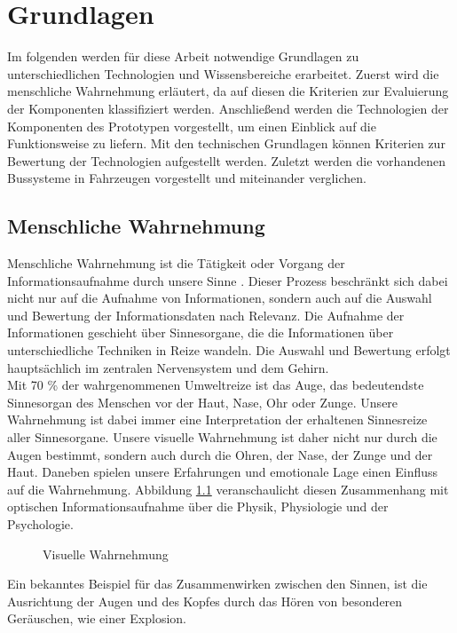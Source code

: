 \chapter{Grundlagen}
\label{cha:Grundlagen}
Im folgenden werden für diese Arbeit notwendige Grundlagen zu unterschiedlichen Technologien und Wissensbereiche erarbeitet. 
Zuerst wird die menschliche Wahrnehmung erläutert, da auf diesen die Kriterien zur Evaluierung der Komponenten klassifiziert werden. Anschließend werden die Technologien der Komponenten des Prototypen vorgestellt, um einen Einblick auf die Funktionsweise zu liefern. Mit den technischen Grundlagen können Kriterien zur Bewertung der Technologien aufgestellt werden. Zuletzt werden die vorhandenen Bussysteme in Fahrzeugen vorgestellt und miteinander verglichen.
\section{Menschliche Wahrnehmung}
Menschliche Wahrnehmung ist die \glqq Tätigkeit oder Vorgang der Informationsaufnahme durch unsere Sinne\grqq{} \cite[Seite 12]{Buhler.2017}. Dieser Prozess beschränkt sich dabei nicht nur auf die Aufnahme von Informationen, sondern auch auf die Auswahl und Bewertung der Informationsdaten nach Relevanz. Die Aufnahme der Informationen geschieht über Sinnesorgane, die die Informationen über unterschiedliche Techniken in Reize wandeln. Die Auswahl und Bewertung erfolgt hauptsächlich im zentralen Nervensystem und dem Gehirn. \cite[Vgl. Seite 12]{Buhler.2017}\\
Mit 70 \% der wahrgenommenen Umweltreize ist das Auge, das bedeutendste Sinnesorgan des Menschen vor der Haut, Nase, Ohr oder Zunge. Unsere Wahrnehmung ist dabei immer eine Interpretation der erhaltenen Sinnesreize aller Sinnesorgane. Unsere visuelle Wahrnehmung ist daher nicht nur durch die Augen bestimmt, sondern auch durch die Ohren, der Nase, der Zunge und der Haut. Daneben spielen unsere Erfahrungen und emotionale Lage einen Einfluss auf die Wahrnehmung. \cite[Vgl. Seite 13 f.]{Buhler.2017}
Abbildung \ref{fig:information} veranschaulicht diesen Zusammenhang mit optischen Informationsaufnahme über die Physik, Physiologie und der Psychologie. \\
\begin{figure}[hbt]
	\centering
	
	\caption[Visuelle Wahrnehmung]{Visuelle Wahrnehmung}
	\label{fig:information}
\end{figure}
Ein bekanntes Beispiel für das Zusammenwirken zwischen den Sinnen, ist die Ausrichtung der Augen und des Kopfes durch das Hören von besonderen Geräuschen, wie einer Explosion.\\
